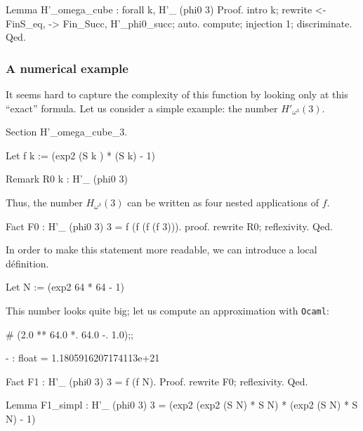 \begin{Coqsrc}
Lemma H'_omega_cube : forall k,
    H'_ (phi0 3)%
Proof.
  intro k; rewrite <-FinS_eq, -> Fin_Succ, H'_phi0_succ; auto.
  compute; injection 1; discriminate.
Qed.
\end{Coqsrc}

\subsubsection{A numerical example}

It seems hard to capture the complexity of this function by looking only at this
``exact'' formula. 
Let us consider a simple example: the number $H'_{\omega^3}(3)$.  

\begin{Coqsrc}
Section H'_omega_cube_3.
  
Let f k :=   (exp2 (S k ) * (S k) - 1)%

Remark R0 k :  H'_ (phi0 3)%
\end{Coqsrc}

Thus, the number $H_{\omega^3}(3)$ can be written as four nested applications of $f$.
 
\begin{Coqsrc}
Fact F0 : H'_ (phi0 3) 3 = f (f (f (f 3))).
proof. rewrite R0; reflexivity. Qed.
\end{Coqsrc}

In order to make this statement more readable, we can introduce a local définition.

\begin{Coqsrc}
Let N := (exp2 64 * 64 - 1)%
\end{Coqsrc}

This number looks quite big; let us compute an approximation with \texttt{Ocaml}:


\begin{Coqsrc}
# (2.0 ** 64.0 *. 64.0 -. 1.0);; 
\end{Coqsrc}

\begin{Coqanswer}
- : float = 1.1805916207174113e+21
\end{Coqanswer}


\begin{Coqsrc}
Fact F1 : H'_ (phi0 3) 3 = f (f N).
Proof.
 rewrite F0; reflexivity. 
Qed.


Lemma F1_simpl : H'_ (phi0 3) 3 =
                 (exp2 (exp2 (S N) * S N) * (exp2 (S N) * S N) - 1)%

\end{Coqsrc}


